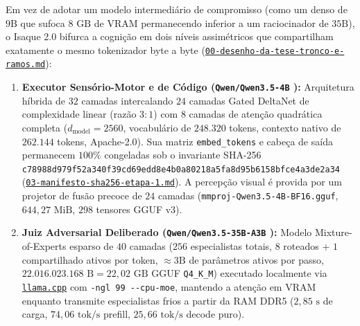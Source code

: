 \documentclass[10pt,a4paper]{article}
\begin{document}
Em vez de adotar um modelo intermedi\'ario de compromisso (como um denso de $9\text{B}$ que sufoca $8\text{ GB}$ de VRAM permanecendo inferior a um raciocinador de $35\text{B}$), o Isaque 2.0 bifurca a cogni\c{c}\~ao em dois n\'iveis assim\'etricos que compartilham exatamente o mesmo tokenizador byte a byte (\href{https://drive.google.com/file/d/1zaJmQCAw1C6ejkSifc1Rp-4uwnenmSwq/view?usp=drivesdk}{\texttt{00-desenho-da-tese-tronco-e-ramos.md}}):
\begin{enumerate}
  \item \textbf{Executor Sens\'orio-Motor e de C\'odigo (\texttt{Qwen/Qwen3.5-4B} \cite{qwen35_4b}):} Arquitetura h\'ibrida de $32$ camadas intercalando $24$ camadas Gated DeltaNet de complexidade linear \cite{yang2025gated} (raz\~ao $3:1$) com $8$ camadas de aten\c{c}\~ao quadr\'atica completa ($d_{\text{model}}=2560$, vocabul\'ario de $248.320$ tokens, contexto nativo de $262.144$ tokens, Apache-2.0). Sua matriz \texttt{embed\_\allowbreak{}tokens} e cabe\c{c}a de sa\'ida permanecem $100\%$ congeladas sob o invariante SHA-256 \texttt{c78988d9\allowbreak{}79f52a34\allowbreak{}0f39cd69\allowbreak{}edd8e4b0\allowbreak{}a80218a5\allowbreak{}fa8d95b6\allowbreak{}158bfce4\allowbreak{}a3de2a34} (\href{https://drive.google.com/file/d/1-1KKupaUYBWjDUcLjemQH0FBSPmnCSj6/view?usp=drivesdk}{\texttt{03-manifesto-sha256-etapa-1.md}}). A percep\c{c}\~ao visual \'e provida por um projetor de fus\~ao precoce de $24$ camadas (\texttt{mmproj-Qwen3.5-4B-BF16.gguf}, $644,27\text{ MiB}$, $298$ tensores GGUF v3).
  \item \textbf{Juiz Adversarial Deliberado (\texttt{Qwen/Qwen3.5-35B-A3B} \cite{qwen35_4b}):} Modelo Mixture-of-Experts esparso de $40$ camadas ($256$ especialistas totais, $8$ roteados + $1$ compartilhado ativos por token, $\approx 3\text{B}$ de par\^ametros ativos por passo, $22.016.023.168\text{ B} = 22,02\text{ GB}$ GGUF \texttt{Q4\_\allowbreak{}K\_\allowbreak{}M}) executado localmente via \href{https://github.com/ggml-org/llama.cpp}{\texttt{llama.cpp}} \cite{llamacpp} com \texttt{-ngl 99 -{}-cpu-moe}, mantendo a aten\c{c}\~ao em VRAM enquanto transmite especialistas frios a partir da RAM DDR5 ($2,85\text{ s}$ de carga, $74,06\text{ tok/s}$ prefill, $25,66\text{ tok/s}$ decode puro).
\end{enumerate}
\end{document}
